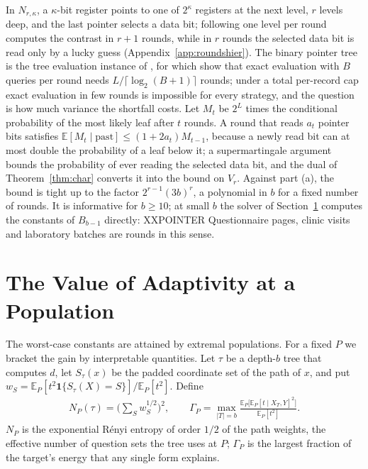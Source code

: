 \documentclass{article}
\newcommand{\E}{\mathbb{E}}
\begin{document}
In $N_{r,\kappa}$, a $\kappa$-bit register points to one of $2^\kappa$ registers at the next level, $r$ levels deep, and the last pointer selects a data bit; following one level per round computes the contrast in $r+1$ rounds, while in $r$ rounds the selected data bit is read only by a lucky guess (Appendix~\ref{app:roundshier}). The binary pointer tree is the tree evaluation instance of \citet{cook2012}, for which \citet{li2026regex} show that exact evaluation with $B$ queries per round needs $L/\lceil\log_2(B+1)\rceil$ rounds; under a total per-record cap exact evaluation in few rounds is impossible for every strategy, and the question is how much variance the shortfall costs. Let $M_t$ be $2^{L}$ times the conditional probability of the most likely leaf after $t$ rounds. A round that reads $a_t$ pointer bits satisfies $\E[M_t\mid\text{past}]\le(1+2a_t)M_{t-1}$, because a newly read bit can at most double the probability of a leaf below it; a supermartingale argument bounds the probability of ever reading the selected data bit, and the dual of Theorem~\ref{thm:char} converts it into the bound on $V_r$. Against part (a), the bound is tight up to the factor $2^{r-1}(3b)^r$, a polynomial in $b$ for a fixed number of rounds. It is informative for $b\ge10$; at small $b$ the solver of Section~\ref{sec:population} computes the constants of $B_{b-1}$ directly: XXPOINTER Questionnaire pages, clinic visits and laboratory batches are rounds in this sense.

\section{The Value of Adaptivity at a Population}\label{sec:population}
The worst-case constants are attained by extremal populations. For a fixed $P$ we bracket the gain by interpretable quantities. Let $\tau$ be a depth-$b$ tree that computes $d$, let $S_\tau(x)$ be the padded coordinate set of the path of $x$, and put $w_S=\E_P[t^2\mathbf 1\{S_\tau(X)=S\}]/\E_P[t^2]$. Define
\begin{gather*}
 N_P(\tau)=\Big(\sum_Sw_S^{1/2}\Big)^2,\qquad
 \Gamma_P=\max_{|T|=b}\frac{\E_P\big[\E_P[t\mid X_T,Y]^2\big]}{\E_P[t^2]}.
\end{gather*}
$N_P$ is the exponential R\'enyi entropy of order $1/2$ of the path weights, the effective number of question sets the tree uses at $P$; $\Gamma_P$ is the largest fraction of the target's energy that any single form explains.
\end{document}

